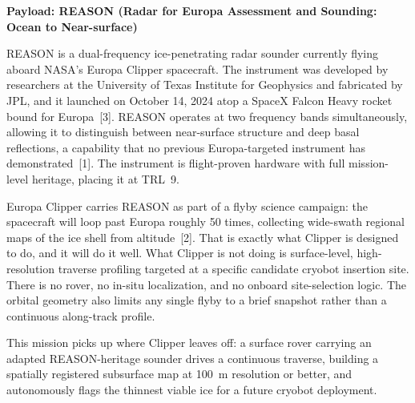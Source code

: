 \documentclass[11pt]{article}
\begin{document}
\noindent\textbf{Payload: REASON (Radar for Europa Assessment and Sounding: Ocean to Near-surface)}

REASON is a dual-frequency ice-penetrating radar sounder currently flying aboard NASA's Europa
Clipper spacecraft. The instrument was developed by researchers at the University of Texas
Institute for Geophysics and fabricated by JPL, and it launched on October 14, 2024 atop a
SpaceX Falcon Heavy rocket bound for Europa~[3]. REASON operates at two frequency bands
simultaneously, allowing it to distinguish between near-surface structure and deep basal
reflections, a capability that no previous Europa-targeted instrument has demonstrated~[1].
The instrument is flight-proven hardware with full mission-level heritage, placing it at TRL~9.

Europa Clipper carries REASON as part of a flyby science campaign: the spacecraft will loop
past Europa roughly 50 times, collecting wide-swath regional maps of the ice shell from
altitude~[2]. That is exactly what Clipper is designed to do, and it will do it well. What
Clipper is not doing is surface-level, high-resolution traverse profiling targeted at a specific
candidate cryobot insertion site. There is no rover, no in-situ localization, and no onboard
site-selection logic. The orbital geometry also limits any single flyby to a brief snapshot
rather than a continuous along-track profile.

This mission picks up where Clipper leaves off: a surface rover carrying an adapted
REASON-heritage sounder drives a continuous traverse, building a spatially registered subsurface
map at 100~m resolution or better, and autonomously flags the thinnest viable ice for a future
cryobot deployment.
\end{document}
